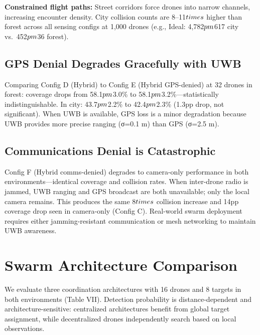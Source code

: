 \documentclass[conference]{IEEEtran}
\begin{document}
\textbf{Constrained flight paths:} Street corridors force drones into
narrow channels, increasing encounter density. City collision counts are
8--11$\\times$ higher than forest across all sensing configs at 1,000 drones
(e.g., Ideal: 4,782$\\pm$617 city vs.~452$\\pm$36 forest).

\subsection{GPS Denial Degrades Gracefully with UWB}\label{d.-gps-denial-degrades-gracefully-with-uwb}

Comparing Config D (Hybrid) to Config E (Hybrid GPS-denied) at 32 drones
in forest: coverage drops from 58.1$\\pm$3.0\% to 58.1$\\pm$3.2\%---statistically
indistinguishable. In city: 43.7$\\pm$2.2\% to 42.4$\\pm$2.3\% (1.3pp drop, not
significant). When UWB is available, GPS loss is a minor degradation
because UWB provides more precise ranging (σ=0.1 m) than GPS (σ=2.5 m).

\subsection{Communications Denial is Catastrophic}\label{e.-communications-denial-is-catastrophic}

Config F (Hybrid comms-denied) degrades to camera-only performance in
both environments---identical coverage and collision rates. When
inter-drone radio is jammed, UWB ranging and GPS broadcast are both
unavailable; only the local camera remains. This produces the same 8$\\times$
collision increase and 14pp coverage drop seen in camera-only (Config
C). Real-world swarm deployment requires either jamming-resistant
communication or mesh networking to maintain UWB awareness.

\section{Swarm Architecture Comparison}\label{v.-swarm-architecture-comparison}

We evaluate three coordination architectures with 16 drones and 8
targets in both environments (Table VII). Detection probability is
distance-dependent and architecture-sensitive: centralized architectures
benefit from global target assignment, while decentralized drones
independently search based on local observations.
\end{document}
